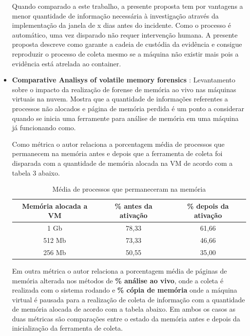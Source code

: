 \documentclass[
	12pt,				%
	openright,			%
	oneside,			%
	a4paper,			%
	english,			%
	french,				%
	spanish,			%
	brazil,				%
	]{abntex2}
\begin{document}
\begin{itemize}
Quando comparado a este trabalho, a presente proposta tem por vantagens a menor quantidade de informação necessária à investigação através da implementação da janela de x
dias antes do incidente. Como o processo é automático, uma vez disparado não requer intervenção humana. A presente proposta descreve como garante a cadeia de custódia da 
evidência e consigue reproduzir o processo de coleta mesmo se a máquina não existir  mais pois a evidência está atrelada ao container.

\item \textbf{Comparative Analisys of volatile memory forensics \cite{Aljaedi2011} }: Levantamento sobre o impacto da realização de forense de memória ao vivo nas máquinas
virtuais na nuvem. Mostra que a quantidade de informações referentes a processos não alocados e página de memória perdida é um ponto a considerar quando se inicia uma
ferramente para análise de memória em uma máquina já funcionando como.

Como métrica o autor relaciona a porcentagem média de processos que permanecem na memória antes e depois que a ferramenta de coleta foi disparada com a quantidade de memória
alocada na VM de acordo com a tabela 3 abaixo.

\begin{table}[h!]
\centering
\caption{Média de processos que permaneceram na memória}
\label{my-label}
\begin{tabular}{c|c|c}
\hline
\textbf{Memória alocada a VM} & \textbf{\% antes da ativação} 			  & \textbf{\% depois da ativação} \\ \hline
1 Gb                          & 78,33                                             & 61,66                          \\ \hline
512 Mb                        & 73,33                                             & 46,66                          \\ \hline
256 Mb                        & 50,55                                             & 35,00                                                          
\end{tabular}
\end{table}

Em outra métrica o autor relaciona a porcentagem média de páginas de memória alterada nos métodos de \textbf{\% análise ao vivo}, onde a coleta é realizada com o sistema rodando e 
\textbf{\% cópia de memória} onde a máquina virtual é pausada para a realização de coleta de informação com a quantidade de memória alocada de acordo com a tabela abaixo. Em ambos
os casos as duas métricas são comparações entre o estado da memória antes e depois da inicialização da ferramenta de coleta.


\end{itemize}
\end{document}
